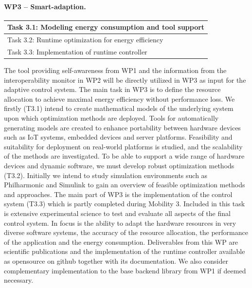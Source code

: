 \documentclass{article}
\begin{document}
\paragraph{WP3 -- Smart-adaption.}
\begin{table}
\vspace{-0.4cm}
\small
\begin{tabular}{ | l |}
\hline
Task 3.1: Modeling energy consumption and tool support\\ \hline
Task 3.2: Runtime optimization for energy efficiency \\ \hline
Task 3.3: Implementation of runtime controller \\ \hline
\end{tabular}
\vspace{-0.3cm}
\end{table}
The tool providing self-awareness from WP1 and the information from the interoperability monitor in WP2 will be directly utilized in WP3 as input for the adaptive control system.
The main task in WP3 is to define the resource allocation to achieve maximal energy efficiency without performance loss.
We firstly (T3.1) intend to create mathematical models of the underlying system upon which optimization methods are deployed.
Tools for automatically generating models are created to enhance portability between hardware devices such as IoT systems, embedded devices and server platforms.
Feasibility and suitability for deployment on real-world platforms is studied, and the scalability of the methods are investigated.
To be able to support a wide range of hardware devices and dynamic software, we must develop robust optimization methods (T3.2).
Initially we intend to study simulation environments such as Philharmonic and Simulink to gain an overview of feasible optimization methods and approaches. 
The main part of WP3 is the implementation of the control system (T3.3) which is partly completed during Mobility 3.
Included in this task is extensive experimental science to test and evaluate all aspects of the final control system.
In focus is the ability to adapt the hardware resources in very diverse software systems, the accuracy of the resource allocation, the performance of the application and the energy consumption.
Deliverables from this WP are scientific publications and the implementation of the runtime controller available as opensource on github together with its documentation.
We also consider complementary implementation to the base backend library from WP1 if deemed necessary.
\end{document}
